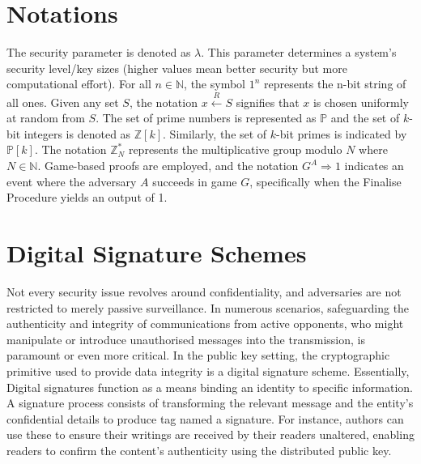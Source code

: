 \documentclass[]{final_report}
\theoremstyle{definition}
\begin{document}
\section{Notations}
The security parameter is denoted as \( \lambda \). 
This parameter determines a system's security level/key sizes (higher values mean better security but more computational effort). For all \( n \in \mathbb{N} \), the symbol \( 1^n \) represents the n-bit string of all ones. Given any set \( S \), the notation \( x \stackrel{R}{\leftarrow} S \) signifies that \( x \) is chosen uniformly at random from \( S \).  The set of prime numbers is represented as \( \mathbb{P} \) and the set of \( k \)-bit integers is denoted as \( \mathbb{Z}[k] \). Similarly, the set of \( k \)-bit primes is indicated by \( \mathbb{P}[k] \). The notation \( \mathbb{Z}_N^* \) represents the multiplicative group modulo \( N \) where \( N \in \mathbb{N} \). Game-based proofs are employed, and the notation \( G^A \Rightarrow 1 \) indicates an event where the adversary \( A \) succeeds in game \( G \), specifically when the Finalise Procedure yields an output of 1.


\section{Digital Signature Schemes}
Not every security issue revolves around confidentiality, and adversaries are not restricted to merely passive surveillance. In numerous scenarios, safeguarding the authenticity and integrity of communications from active opponents, who might manipulate or introduce unauthorised messages into the transmission, is paramount or even more critical. In the public key setting, the cryptographic primitive used to provide data integrity is a digital signature scheme. Essentially, Digital signatures function as a means binding an identity to specific information. A signature process consists of transforming the relevant message and the entity's confidential details to produce tag named a signature. 
For instance, authors can use these to ensure their writings are received by their readers unaltered, enabling readers to confirm the content's authenticity using the distributed public key.
\end{document}
